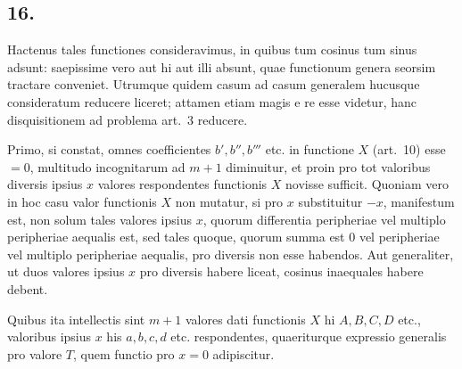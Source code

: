 \documentclass[12pt,a4paper]{article}
\theoremstyle{plain}
\begin{document}
\subsection*{16.}

Hactenus tales functiones consideravimus, in quibus tum cosinus tum sinus adsunt: saepissime vero aut hi aut illi absunt, quae functionum genera seorsim
tractare conveniet. Utrumque quidem casum ad casum generalem hucusque consideratum reducere liceret; attamen etiam magis e re esse videtur, hanc disquisitionem
ad problema art.\ 3 reducere.

Primo, si constat, omnes coefficientes $b', b'', b'''$ etc. in functione $X$ (art.\ 10) esse $=0$, multitudo incognitarum ad $m+1$ diminuitur, et proin pro tot valoribus
diversis ipsius $x$ valores respondentes functionis $X$ novisse sufficit. Quoniam vero in hoc casu valor functionis $X$ non mutatur, si pro $x$ substituitur $-x$, manifestum
est, non solum tales valores ipsius $x$, quorum differentia peripheriae vel multiplo peripheriae aequalis est, sed tales quoque, quorum summa est $0$ vel peripheriae
vel multiplo peripheriae aequalis, pro diversis non esse habendos. Aut generaliter, ut duos valores ipsius $x$ pro diversis habere liceat, cosinus inaequales habere debent.

Quibus ita intellectis sint $m+1$ valores dati functionis $X$ hi $A, B, C, D$ etc., valoribus ipsius $x$ his $a, b, c, d$ etc. respondentes, quaeriturque expressio generalis
pro valore $T$, quem functio pro $x=0$ adipiscitur.
\end{document}
